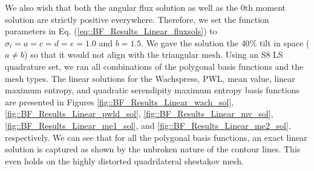 \noindent We also wish that both the angular flux solution as well as the 0th moment solution are strictly positive everywhere. Therefore, we set the function parameters in Eq. (\ref{eq::BF_Results_Linear_fluxsols}) to $\sigma_t = a = c = d = e = 1.0$ and $b = 1.5$. We gave the solution the $40 \%$ tilt in space ($a \neq b$) so that it would not align with the triangular mesh. Using an S8 LS quadrature set, we ran all combinations of the polygonal basis functions and the mesh types. The linear solutions for the Wachspress, PWL, mean value, linear maximum entropy, and quadratic serendipity maximum entropy basis functions are presented in Figures \ref{fig::BF_Results_Linear_wach_sol}, \ref{fig::BF_Results_Linear_pwld_sol}, \ref{fig::BF_Results_Linear_mv_sol}, \ref{fig::BF_Results_Linear_me1_sol}, and \ref{fig::BF_Results_Linear_me2_sol}, respectively. We can see that for all the polygonal basis functions, an exact linear solution is captured as shown by the unbroken nature of the contour lines. This even holds on the highly distorted quadrilateral shestakov mesh.

